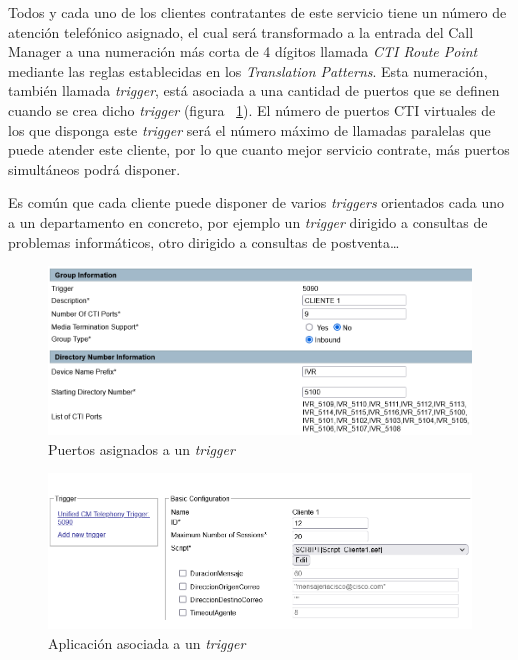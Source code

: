 \documentclass[a4paper, 12pt]{book}
\begin{document}
Todos y cada uno de los clientes contratantes de este servicio tiene un número de atención telefónico asignado, el cual será transformado a la entrada del Call Manager a una numeración más corta de 4 dígitos llamada \emph{CTI Route Point} mediante las reglas establecidas en los \emph{Translation Patterns}. Esta numeración, también llamada \emph{trigger}, está asociada a una cantidad de puertos que se definen cuando se crea dicho \emph{trigger} (figura ~\ref{figura:fig_ctiports}). El número de puertos CTI virtuales de los que disponga este \emph{trigger} será el número máximo de llamadas paralelas que puede atender este cliente, por lo que cuanto mejor servicio contrate, más puertos simultáneos podrá disponer. 

Es común que cada cliente puede disponer de varios \emph{triggers} orientados cada uno a un departamento en concreto, por ejemplo un \emph{trigger} dirigido a consultas de problemas informáticos, otro dirigido a consultas de postventa\ldots

\begin{figure}
  \centering
  \includegraphics[scale = 0.85]{img/fig_ctiports}
  \caption{Puertos asignados a un \emph{trigger}}
  \label{figura:fig_ctiports}
\end{figure}

\begin{figure}
  \centering
  \includegraphics[scale = 0.85]{img/fig_aplicacion}
  \caption{Aplicación asociada a un \emph{trigger}}
  \label{figura:fig_aplicacion}
\end{figure}
\end{document}
